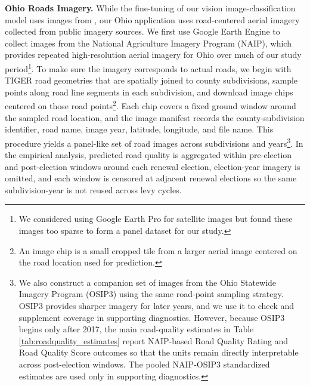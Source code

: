 {\bf Ohio Roads Imagery.} While the fine-tuning of our vision image-classification model uses images from \cite{brewer2021}, our Ohio application uses road-centered aerial imagery collected from public imagery sources. We first use Google Earth Engine to collect images from the National Agriculture Imagery Program (NAIP), which provides repeated high-resolution aerial imagery for Ohio over much of our study period\footnote{We considered using Google Earth Pro for satellite images but found these images too sparse to form a panel dataset for our study.}. To make sure the imagery corresponds to actual roads, we begin with TIGER road geometries that are spatially joined to county subdivisions, sample points along road line segments in each subdivision, and download image chips centered on those road points\footnote{An image chip is a small cropped tile from a larger aerial image centered on the road location used for prediction.}. Each chip covers a fixed ground window around the sampled road location, and the image manifest records the county-subdivision identifier, road name, image year, latitude, longitude, and file name. This procedure yields a panel-like set of road images across subdivisions and years\footnote{We also construct a companion set of images from the Ohio Statewide Imagery Program (OSIP3) using the same road-point sampling strategy. OSIP3 provides sharper imagery for later years, and we use it to check and supplement coverage in supporting diagnostics. However, because OSIP3 begins only after 2017, the main road-quality estimates in Table \ref{tab:roadquality_estimates} report NAIP-based Road Quality Rating and Road Quality Score outcomes so that the units remain directly interpretable across post-election windows. The pooled NAIP-OSIP3 standardized estimates are used only in supporting diagnostics.}. In the empirical analysis, predicted road quality is aggregated within pre-election and post-election windows around each renewal election, election-year imagery is omitted, and each window is censored at adjacent renewal elections so the same subdivision-year is not reused across levy cycles.


